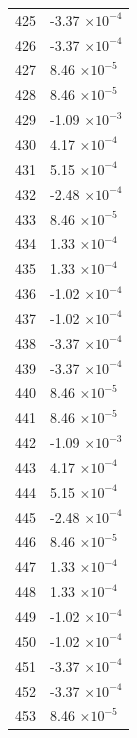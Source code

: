 \documentclass[a4paper,11pt]{article}
\begin{document}
\begin{center}
\begin{longtable}{|R{1.5cm}|R{2.5cm}|}
  425 &        -3.37 $\times 10^{          -4}$ \\
  426 &        -3.37 $\times 10^{          -4}$ \\
  427 &         8.46 $\times 10^{          -5}$ \\
  428 &         8.46 $\times 10^{          -5}$ \\
  429 &        -1.09 $\times 10^{          -3}$ \\
  430 &         4.17 $\times 10^{          -4}$ \\
  431 &         5.15 $\times 10^{          -4}$ \\
  432 &        -2.48 $\times 10^{          -4}$ \\
  433 &         8.46 $\times 10^{          -5}$ \\
  434 &         1.33 $\times 10^{          -4}$ \\
  435 &         1.33 $\times 10^{          -4}$ \\
  436 &        -1.02 $\times 10^{          -4}$ \\
  437 &        -1.02 $\times 10^{          -4}$ \\
  438 &        -3.37 $\times 10^{          -4}$ \\
  439 &        -3.37 $\times 10^{          -4}$ \\
  440 &         8.46 $\times 10^{          -5}$ \\
  441 &         8.46 $\times 10^{          -5}$ \\
  442 &        -1.09 $\times 10^{          -3}$ \\
  443 &         4.17 $\times 10^{          -4}$ \\
  444 &         5.15 $\times 10^{          -4}$ \\
  445 &        -2.48 $\times 10^{          -4}$ \\
  446 &         8.46 $\times 10^{          -5}$ \\
  447 &         1.33 $\times 10^{          -4}$ \\
  448 &         1.33 $\times 10^{          -4}$ \\
  449 &        -1.02 $\times 10^{          -4}$ \\
  450 &        -1.02 $\times 10^{          -4}$ \\
  451 &        -3.37 $\times 10^{          -4}$ \\
  452 &        -3.37 $\times 10^{          -4}$ \\
  453 &         8.46 $\times 10^{          -5}$ \\

\end{longtable}
\end{center}
\end{document}
